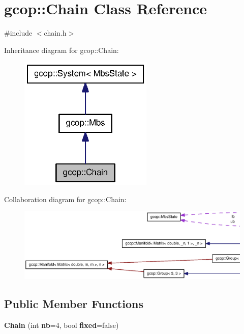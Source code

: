 \section{gcop\-:\-:\-Chain \-Class \-Reference}
\label{classgcop_1_1Chain}


{\ttfamily \#include $<$chain.\-h$>$}



\-Inheritance diagram for gcop\-:\-:\-Chain\-:
\nopagebreak
\begin{figure}[H]
\begin{center}
\leavevmode
\includegraphics[width=180pt]{classgcop_1_1Chain__inherit__graph}
\end{center}
\end{figure}


\-Collaboration diagram for gcop\-:\-:\-Chain\-:
\nopagebreak
\begin{figure}[H]
\begin{center}
\leavevmode
\includegraphics[width=350pt]{classgcop_1_1Chain__coll__graph}
\end{center}
\end{figure}
\subsection*{\-Public \-Member \-Functions}
\begin{DoxyCompactItemize}
\item 
{\bf \-Chain} (int {\bf nb}=4, bool {\bf fixed}=false)
\end{DoxyCompactItemize}


